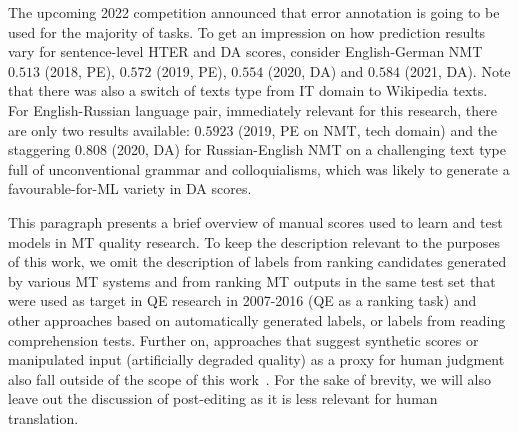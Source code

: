 The upcoming 2022 competition announced that error annotation is going to be used for the majority of tasks.
To get an impression on how prediction results vary for sentence-level HTER and DA scores, consider English-German NMT $0.513$ (2018, \gls{PE}), $0.572$ (2019, PE), $0.554$ (2020, DA) and $0.584$ (2021, DA). Note that there was also a switch of texts type from IT domain to Wikipedia texts. For English-Russian language pair, immediately relevant for this research, there are only two results available: $0.5923$ (2019, PE on NMT, tech domain) and the staggering $0.808$ (2020, DA) for Russian-English NMT on a challenging text type full of unconventional grammar and colloquialisms, which was likely to generate a favourable-for-ML variety in DA scores.  
   
This paragraph presents a brief overview of manual scores used to learn and test models in MT quality research.
To keep the description relevant to the purposes of this work, we omit the description of labels from ranking candidates generated by various MT systems and from ranking MT outputs in the same test set that were used as target in QE research in 2007-2016 (QE as a ranking task) and other approaches based on automatically generated labels, or labels from reading comprehension tests. Further on, approaches that suggest synthetic scores or manipulated input (artificially degraded quality) as a proxy for human judgment also fall outside of the scope of this work~\cite[see, for example,][where they introduce modifications into MT output to capture critical errors related to sentiment transfer]{Saadany2021}. 
For the sake of brevity, we will also leave out the discussion of post-editing as it is less relevant for human translation. 

